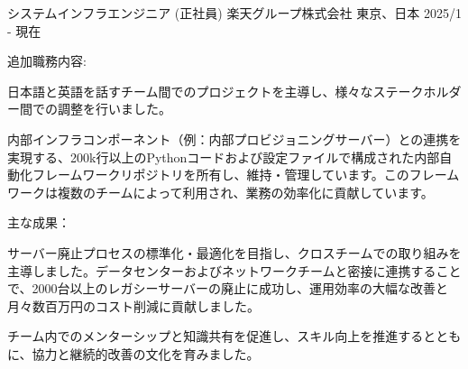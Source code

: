 

\begin{cventries}
  \cventry
    {システムインフラエンジニア (正社員)} %
    {楽天グループ株式会社} %
    {東京、日本} %
    {2025/1 - 現在} %
    {
      追加職務内容:
      \begin{cvbullets}
        \item 日本語と英語を話すチーム間でのプロジェクトを主導し、様々なステークホルダー間での調整を行いました。
        \item 内部インフラコンポーネント（例：内部プロビジョニングサーバー）との連携を実現する、200k行以上のPythonコードおよび設定ファイルで構成された内部自動化フレームワークリポジトリを所有し、維持・管理しています。このフレームワークは複数のチームによって利用され、業務の効率化に貢献しています。
      \end{cvbullets}
      主な成果：
      \begin{cvbullets}
        \item サーバー廃止プロセスの標準化・最適化を目指し、クロスチームでの取り組みを主導しました。データセンターおよびネットワークチームと密接に連携することで、2000台以上のレガシーサーバーの廃止に成功し、運用効率の大幅な改善と月々数百万円のコスト削減に貢献しました。
        \item チーム内でのメンターシップと知識共有を促進し、スキル向上を推進するとともに、協力と継続的改善の文化を育みました。
      \end{cvbullets}
    }


\end{cventries}
